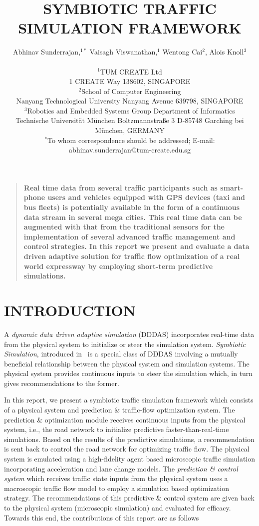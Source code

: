 \documentclass[12pt]{article}
\title{SYMBIOTIC TRAFFIC SIMULATION FRAMEWORK}
\author
{Abhinav Sunderrajan,$^{1\ast}$ Vaisagh Viswanathan,$^{1}$ Wentong Cai$^{2}$, Alois Knoll$^{3}$\\
\\
\normalsize{$^{1}$TUM CREATE Ltd}\\
\normalsize{1 CREATE Way 138602, SINGAPORE}\\
\normalsize{$^{2}$School of Computer Engineering}\\
\normalsize{Nanyang Technological University Nanyang Avenue 639798, SINGAPORE}\\
\normalsize{$^{3}$Robotics and Embedded Systems Group Department of Informatics}\\
\normalsize{Technische Universit\"at M\"unchen Boltzmannstra{\ss}e 3 D-85748 Garching bei M\"unchen, GERMANY}\\
\normalsize{$^\ast$To whom correspondence should be addressed; E-mail:  abhinav.sunderrajan@tum-create.edu.sg}
}
\date{}
\newenvironment{sciabstract}{%
\begin{quote} \bf}
{\end{quote}}
\begin{document}
 


\baselineskip24pt


\maketitle 




\begin{sciabstract}
Real time data from several traffic participants such as smart-phone users and vehicles equipped with GPS devices (taxi and bus fleets) is potentially available in the form of a continuous data stream in several mega cities. This real time data can be augmented with that from the traditional sensors for the implementation of several advanced traffic management and control strategies. In this report we present and evaluate a data driven adaptive solution for traffic flow optimization of a real world expressway by employing short-term predictive simulations.
\end{sciabstract}



\section{INTRODUCTION}
A  {\it dynamic data driven adaptive simulation} (DDDAS) incorporates real-time data from the physical system to initialize or steer the simulation system. {\it Symbiotic Simulation}, introduced in~\cite{fujimotoeditors} is a special class of DDDAS involving a mutually beneficial relationship between the physical system and simulation systems. The physical system  provides continuous inputs to steer the simulation which, in turn gives recommendations to the former.

In this report, we present a symbiotic traffic simulation framework which consists of a physical system and prediction \& traffic-flow optimization system. The prediction \& optimization module receives continuous inputs from the physical system, i.e., the road network to initialize predictive faster-than-real-time simulations. Based on the results of the predictive simulations, a recommendation is sent back to control the road network for optimizing traffic flow. The physical system is emulated using a high-fidelity agent based microscopic traffic simulation incorporating acceleration and lane change models. The {\it prediction \& control system} which receives traffic state inputs from the physical system uses a macroscopic traffic flow model to employ a simulation based optimization strategy. The recommendations of this predictive \& control system are given back to the physical system (microscopic simulation) and evaluated for efficacy. Towards this end, the contributions of this report are as follows
\end{document}
